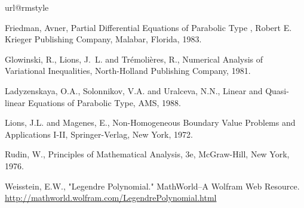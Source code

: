 \begin{thebibliography}{1}
\providecommand{\url}[1]{#1}
\csname url@rmstyle\endcsname
\providecommand{\newblock}{\relax}
\providecommand{\bibinfo}[2]{#2}
\providecommand\BIBentrySTDinterwordspacing{\spaceskip=0pt\relax}
\providecommand\BIBentryALTinterwordstretchfactor{4}
\providecommand\BIBentryALTinterwordspacing{\spaceskip=\fontdimen2\font plus
\BIBentryALTinterwordstretchfactor\fontdimen3\font minus
  \fontdimen4\font\relax}
\providecommand\BIBforeignlanguage[2]{{%
\expandafter\ifx\csname l@#1\endcsname\relax
\typeout{** WARNING: IEEEtran.bst: No hyphenation pattern has been}%
\typeout{** loaded for the language `#1'. Using the pattern for}%
\typeout{** the default language instead.}%
\else
\language=\csname l@#1\endcsname
\fi
#2}}

 Friedman, Avner,
Partial Differential Equations of Parabolic Type , Robert E. Krieger
Publishing Company, Malabar, Florida, 1983.

 Glowinski, R., Lions, J.~L. and Tr\'{e}moli\`{e}res, R.,
Numerical Analysis of Variational Inequalities, North-Holland Publishing
Company, 1981.

 Ladyzenskaya, O.A., Solonnikov, V.A. and Uralceva, N.N.,
Linear and Quasi-linear Equations of Parabolic Type, AMS, 1988.

 Lions, J.L. and Magenes, E.,
Non-Homogeneous Boundary Value Problems and Applications I-II,
Springer-Verlag, New York, 1972.

 Rudin, W.,
Principles of Mathematical Analysis, 3e,
McGraw-Hill, New York, 1976.

 Weisstein, E.W.,
"Legendre Polynomial."
MathWorld--A Wolfram Web Resource. \href{http://mathworld.wolfram.com/LegendrePolynomial.html}{http://mathworld.wolfram.com/LegendrePolynomial.html}

\end{thebibliography}
